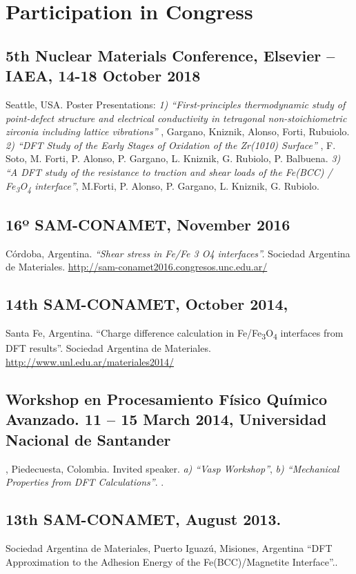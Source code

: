 \section{Participation in Congress}

\subsection{ 5th Nuclear Materials Conference, Elsevier – IAEA, 14-18 October 2018} Seattle, USA. Poster Presentations:
\emph{ 1) “First-principles thermodynamic study of point-defect structure and electrical conductivity in tetragonal non-stoichiometric zirconia including lattice vibrations”} , Gargano, Kniznik, Alonso, Forti, Rubuiolo. \emph{ 2) “DFT Study of the Early Stages of Oxidation of the Zr(1010) Surface”} , F. Soto, M. Forti, P. Alonso, P. Gargano, L. Kniznik, G. Rubiolo, P. Balbuena. \emph{ 3) “A DFT study of the resistance to traction and shear loads of the Fe(BCC) / Fe\textsubscript{3}O\textsubscript{4} interface”}, M.Forti, P. Alonso, P. Gargano, L. Kniznik, G. Rubiolo. 

\subsection{16º SAM-CONAMET, November 2016} Córdoba, Argentina. \emph{“Shear stress in Fe/Fe 3 O4 interfaces”. }Sociedad Argentina de Materiales. \url{http://sam-conamet2016.congresos.unc.edu.ar/}

\subsection{14th SAM-CONAMET, October 2014,} Santa Fe, Argentina. “Charge difference calculation in Fe/Fe\textsubscript{3}O\textsubscript{4} interfaces from DFT results”. Sociedad Argentina de Materiales. \url{http://www.unl.edu.ar/materiales2014/}

\subsection{ Workshop en Procesamiento Físico Químico Avanzado. 11 – 15 March 2014, Universidad Nacional de Santander}, Piedecuesta, Colombia. Invited speaker. \emph{ a) “Vasp Workshop”},\emph{ b) “Mechanical Properties from DFT Calculations”}. 
.

\subsection{13th SAM-CONAMET, August 2013.} Sociedad Argentina de Materiales, Puerto Iguazú, Misiones, Argentina “DFT Approximation to the Adhesion Energy of the Fe(BCC)/Magnetite Interface”..

